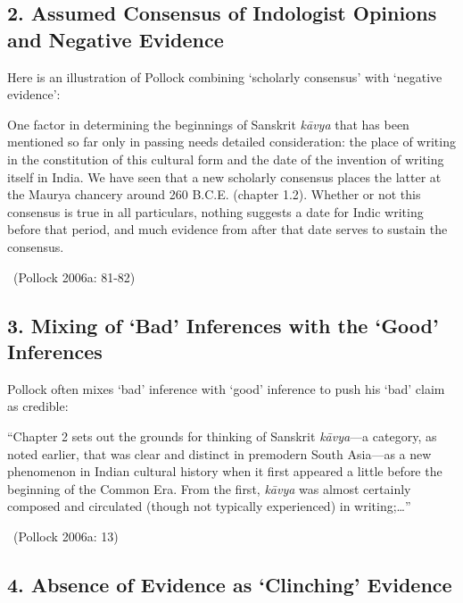 \subsection*{2. Assumed Consensus of Indologist Opinions \hfill\break and Negative Evidence}

Here is an illustration of Pollock combining ‘scholarly consensus’ with ‘negative evidence’:

\begin{myquote}
One factor in determining the beginnings of Sanskrit \textit{kāvya} that has been mentioned so far only in passing needs detailed consideration: the place of writing in the constitution of this cultural form and the date of the invention of writing itself in India. We have seen that a new scholarly consensus places the latter at the Maurya chancery around 260 B.C.E. (chapter 1.2). Whether or not this consensus is true in all particulars, nothing suggests a date for Indic writing before that period, and much evidence from after that date serves to sustain the consensus. 

~\hfill (Pollock 2006a: 81-82)
\end{myquote}

\vspace{-.3cm}

\subsection*{3. Mixing of ‘Bad’ Inferences with the ‘Good’ Inferences}

Pollock often mixes ‘bad’ inference with ‘good’ inference to push his ‘bad’ claim as credible:

\begin{myquote}
“Chapter 2 sets out the grounds for thinking of Sanskrit \textit{kāvya}—a category, as noted earlier, that was clear and distinct in premodern South Asia—as a new phenomenon in Indian cultural history when it ﬁrst appeared a little before the beginning of the Common Era. From the ﬁrst, \textit{kāvya} was almost certainly composed and circulated (though not typically experienced) in writing;…” 

~\hfill (Pollock 2006a: 13)
\end{myquote}

\vspace{-.3cm}

\subsection*{4. Absence of Evidence as ‘Clinching’ Evidence}

